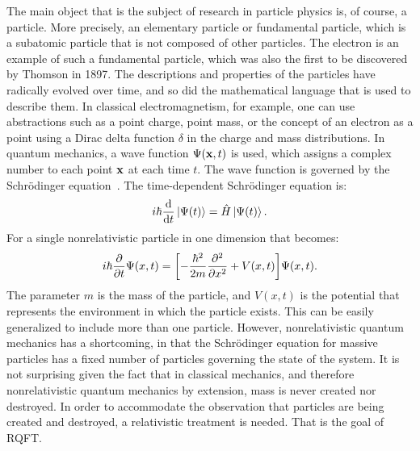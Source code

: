 The main object that is the subject of research in particle physics is, of course, a particle. More precisely, an elementary particle or fundamental particle, which is a subatomic particle that is not composed of other particles. The electron is an example of such a fundamental particle, which was also the first to be discovered by Thomson in 1897. The descriptions and properties of the particles have radically evolved over time, and so did the mathematical language that is used to describe them. In classical electromagnetism, for example, one can use abstractions such as a point charge, point mass, or the concept of an electron as a point using a Dirac delta function $\delta$ in the charge and mass distributions. In quantum mechanics, a wave function $\Psi(\vb{x},t)$ is used, which assigns a complex number to each point $\vb{x}$ at each time $t$. The wave function is governed by the Schrödinger equation~\cite{Liboff2002-vc,Cohen-Tannoudji1977-ms,Cohen-Tannoudji1977-rq}. The time-dependent Schrödinger equation is:
\begin{equation}
i\hbar\dv{t}\ket{\Psi(t)}=\hat{H}\ket{\Psi(t)}.
\label{eq:schrodinger-eq}
\end{equation}
For a single nonrelativistic particle in one dimension that becomes:
\begin{equation}
i\hbar\pdv{t}\Psi(x,t)=\qty[-\frac{\hbar^2}{2m}\pdv[2]{x}+V(x,t)] \Psi(x,t).
\label{eq:schrodinger-single-eq}
\end{equation}
The parameter $m$ is the mass of the particle, and $V(x,t)$ is the potential that represents the environment in which the particle exists. This can be easily generalized to include more than one particle. However, nonrelativistic quantum mechanics has a shortcoming, in that the Schrödinger equation for massive particles has a fixed number of particles governing the state of the system. It is not surprising given the fact that in classical mechanics, and therefore nonrelativistic quantum mechanics by extension, mass is never created nor destroyed. In order to accommodate the observation that particles are being created and destroyed, a relativistic treatment is needed. That is the goal of RQFT.

